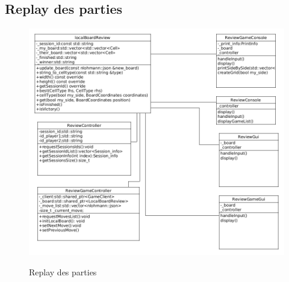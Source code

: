 \documentclass[../design_fonctionnement_sys.tex]{subfiles}
\begin{document}
\subsection{Replay des parties}
\begin{figure}[H]
    \centering
    \includegraphics[scale=0.25]{img_design/FonctionnementReview.png}
    \label{fig:review}
    \caption{Replay des parties}
\end{figure}
\end{document}
